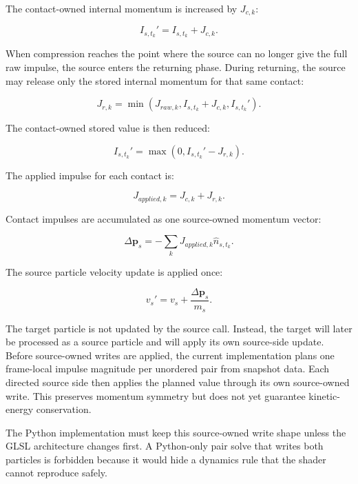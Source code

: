 The contact-owned internal momentum is increased by $J_{c,k}$:

\begin{equation}
I_{s,t_k}' = I_{s,t_k} + J_{c,k}.
\end{equation}

When compression reaches the point where the source can no longer give the full
raw impulse, the source enters the returning phase.  During returning, the
source may release only the stored internal momentum for that same contact:

\begin{equation}
J_{r,k} =
\min\left(J_{raw,k}, I_{s,t_k} + J_{c,k}, I_{s,t_k}'\right).
\end{equation}

The contact-owned stored value is then reduced:

\begin{equation}
I_{s,t_k}' = \max(0, I_{s,t_k}' - J_{r,k}).
\end{equation}

The applied impulse for each contact is:

\begin{equation}
J_{applied,k} = J_{c,k} + J_{r,k}.
\end{equation}

Contact impulses are accumulated as one source-owned momentum vector:

\begin{equation}
\Delta \mathbf{p}_s =
-\sum_k J_{applied,k}\hat{n}_{s,t_k}.
\end{equation}

The source particle velocity update is applied once:

\begin{equation}
v_s' = v_s + \frac{\Delta \mathbf{p}_s}{m_s}.
\end{equation}

The target particle is not updated by the source call.  Instead, the target
will later be processed as a source particle and will apply its own source-side
update.  Before source-owned writes are applied, the current implementation
plans one frame-local impulse magnitude per unordered pair from snapshot data.
Each directed source side then applies the planned value through its own
source-owned write.  This preserves momentum symmetry but does not yet
guarantee kinetic-energy conservation.

The Python implementation must keep this source-owned write shape unless the
GLSL architecture changes first.  A Python-only pair solve that writes both
particles is forbidden because it would hide a dynamics rule that the shader
cannot reproduce safely.

